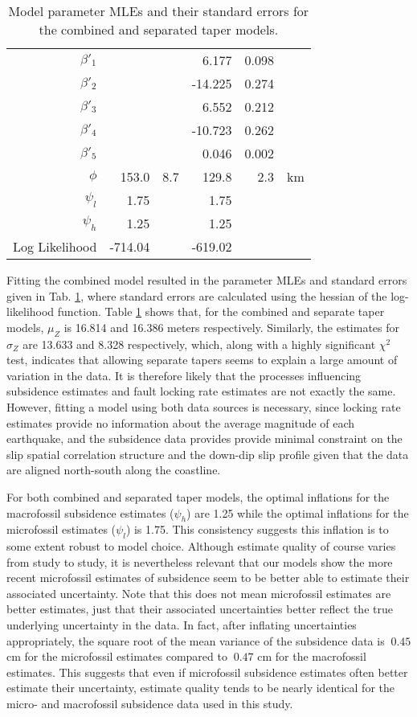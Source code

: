 {\begin{table}[ht]
\begin{tabular}{rrrrrr}
  $\beta'_1$ &  &  & 6.177 & 0.098 & \\ 
  $\beta'_2$ &  &  & -14.225 & 0.274 & \\ 
  $\beta'_3$ &  &  & 6.552 & 0.212 & \\ 
  $\beta'_4$ &  &  & -10.723 & 0.262 & \\ 
  $\beta'_5$ &  &  & 0.046 & 0.002 & \\ 
  $\phi $& 153.0 & 8.7 & 129.8 & 2.3 & km \\ 
  $\psi_l$ & 1.75 &  & 1.75 &  \\ 
  $\psi_h$ & 1.25 &  & 1.25 &  \\ 
  Log Likelihood & -714.04 & & -619.02 & \\
   \hline
\end{tabular}
\caption{Model parameter MLEs and their standard errors for the combined and separated taper models.}
\label{dataStats}
\end{table}

Fitting the combined model resulted in the parameter MLEs and standard errors given in Tab. \ref{dataStats}, where standard errors are calculated using the hessian of the log-likelihood function.  Table \ref{dataStats} shows that, for the combined and separate taper models, $\mu_Z$ is 16.814 and 16.386 meters respectively.  Similarly, the estimates for $\sigma_Z$ are 13.633 and 8.328 respectively, which, along with a highly significant $\chi^2$ test, indicates that allowing separate tapers seems to explain a large amount of variation in the data.  It is therefore likely that the processes influencing subsidence estimates and fault locking rate estimates are not exactly the same.  However, fitting a model using both data sources is necessary, since locking rate estimates provide no information about the average magnitude of each earthquake, and the subsidence data provides provide minimal constraint on the slip spatial correlation structure and the down-dip slip profile given that the data are aligned north-south along the coastline.

For both combined and separated taper models, the optimal inflations for the macrofossil subsidence estimates ($\psi_h$) are 1.25 while the optimal inflations for the microfossil estimates  ($\psi_l$) is 1.75.  This consistency suggests this inflation is to some extent robust to model choice.  Although estimate quality of course varies from study to study, it is nevertheless relevant that our models show the more recent microfossil estimates of subsidence seem to be better able to estimate their associated uncertainty.  Note that this does not mean microfossil estimates are better estimates, just that their associated uncertainties better reflect the true underlying uncertainty in the data.  In fact, after inflating uncertainties appropriately, the square root of the mean variance of the subsidence data is $~0.45$ cm for the microfossil estimates compared to $~0.47$ cm for the macrofossil estimates.  This suggests that even if microfossil subsidence estimates often better estimate their uncertainty, estimate quality tends to be nearly identical for the micro- and macrofossil subsidence data used in this study.

}
